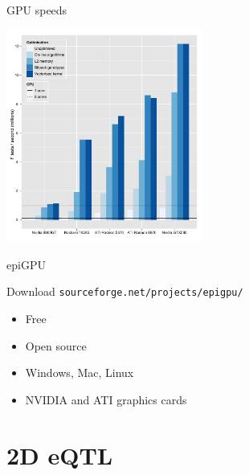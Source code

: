 \documentclass{beamer}
\begin{document}
\begin{frame}{GPU speeds}
	\begin{center}
		\includegraphics[height=7cm]{gpuoptimisation.pdf}
	\end{center}
\end{frame}

\begin{frame}{epiGPU}	
	\begin{block}{Download}
		{\tt sourceforge.net/projects/epigpu/}
	\end{block}
	\begin{itemize}
		\item Free
		\item Open source
		\item Windows, Mac, Linux
		\item NVIDIA and ATI graphics cards
	\end{itemize}
\end{frame}




\section{2D eQTL}
\subsection{}

\end{document}
